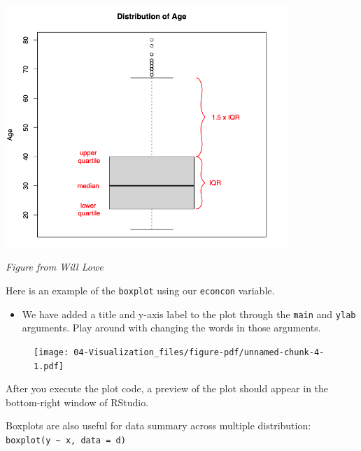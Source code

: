 \documentclass[
  letterpaper,
  DIV=11,
  numbers=noendperiod]{scrreprt}
\newenvironment{Shaded}{\begin{snugshade}}{\end{snugshade}}
\newcommand{\AttributeTok}[1]{\textcolor[rgb]{0.40,0.45,0.13}{#1}}
\newcommand{\FunctionTok}[1]{\textcolor[rgb]{0.28,0.35,0.67}{#1}}
\newcommand{\NormalTok}[1]{\textcolor[rgb]{0.00,0.23,0.31}{#1}}
\newcommand{\SpecialCharTok}[1]{\textcolor[rgb]{0.37,0.37,0.37}{#1}}
\newcommand{\StringTok}[1]{\textcolor[rgb]{0.13,0.47,0.30}{#1}}
\providecommand{\tightlist}{%
  \setlength{\itemsep}{0pt}\setlength{\parskip}{0pt}}\usepackage{longtable,booktabs,array}
\begin{document}
\includegraphics[width=0.8\textwidth,height=\textheight]{images/agebox.png}

\emph{Figure from Will Lowe}

Here is an example of the \texttt{boxplot} using our \texttt{econcon}
variable.

\begin{itemize}
\tightlist
\item
  We have added a title and y-axis label to the plot through the
  \texttt{main} and \texttt{ylab} arguments. Play around with changing
  the words in those arguments.
\end{itemize}

\begin{Shaded}
\end{Shaded}

\begin{figure}[H]

{\centering \texttt{[image: 04-Visualization\_files/figure-pdf/unnamed-chunk-4-1.pdf]}

}

\end{figure}

After you execute the plot code, a preview of the plot should appear in
the bottom-right window of RStudio.

Boxplots are also useful for data summary across multiple distribution:
\texttt{boxplot(y\ \textasciitilde{}\ x,\ data\ =\ d)}
\end{document}
